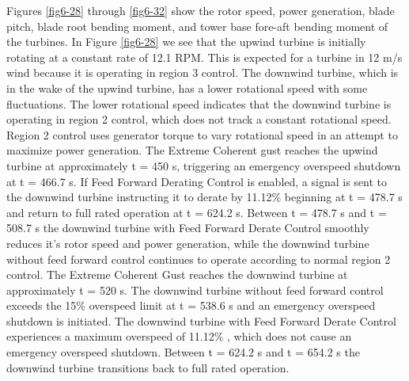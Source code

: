  Figures \ref{fig6-28} through \ref{fig6-32} show the rotor speed, power generation, blade pitch, blade root bending moment, and tower base fore-aft bending moment of the turbines. In Figure \ref{fig6-28} we see that the upwind turbine is initially rotating at a constant rate of 12.1 RPM. This is expected for a turbine in 12 m/s wind because it is operating in region 3 control. The downwind turbine, which is in the wake of the upwind turbine,  has a lower rotational speed with some fluctuations. The lower rotational speed indicates that the downwind turbine is operating in region 2 control, which does not track a constant rotational speed. Region 2 control uses generator torque to vary rotational speed in an attempt to maximize power generation. The Extreme Coherent gust reaches the upwind turbine at approximately t = 450 s, triggering an emergency overspeed shutdown at t = 466.7 s. If Feed Forward Derating Control is enabled, a signal is sent to the downwind turbine instructing it to derate by 11.12\% beginning at t = 478.7 s and return to full rated operation at t = 624.2 s. Between t = 478.7 s and t = 508.7 s the downwind turbine with Feed Forward Derate Control smoothly reduces it's rotor speed and power generation, while the downwind turbine without feed forward control continues to operate according to normal region 2 control. The Extreme Coherent Gust reaches the downwind turbine at approximately t = 520 s. The downwind turbine without feed forward control exceeds the 15\% overspeed limit at t = 538.6 s and an emergency overspeed shutdown is initiated. The downwind turbine with Feed Forward Derate Control experiences a maximum overspeed of 11.12\% , which does not cause an emergency overspeed shutdown. Between t = 624.2 s and t = 654.2 s the downwind turbine transitions back to full rated operation.


